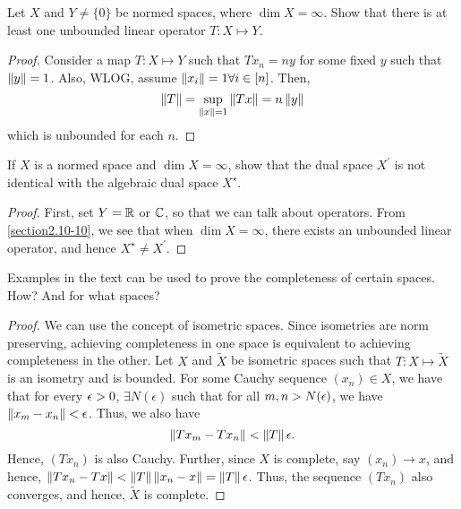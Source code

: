 \begin{question}
    Let $X$ and $Y\neq\{0\}$ be normed spaces, where $\dim X = \infty$. Show that there is at least one unbounded linear operator $T : X \mapsto Y$.
    \label{section2.10-10}
\end{question}
\begin{proof}
        Consider a map $T : X \mapsto Y$ such that $Tx_n = n y$ for some fixed $y$ such that $\left\lVert y \right\rVert = 1$. Also, WLOG, assume $\left\lVert x_i \right\rVert = 1 \forall i \in [n]$. Then, 
        \[\left\lVert T \right\rVert = \sup_{\left\lVert x \right\rVert = 1} \left\lVert Tx \right\rVert = n \left\lVert y \right\rVert\]
        which is unbounded for each $n$.
\end{proof}

\begin{question}
    If $X$ is a normed space and $\dim X = \infty$, show that the dual space $X^\prime$ is not identical with the algebraic dual space $X^\star$.
    \label{section2.10-11}
\end{question}
\begin{proof}
        First, set $Y = \mathbb{R}$ or $ \mathbb{C}$, so that we can talk about operators. From \ref{section2.10-10}, we see that when $\dim X = \infty$, there exists an unbounded linear operator, and hence $X^\star \neq X^\prime$.
\end{proof}

\begin{question}
    Examples in the text can be used to prove the completeness of certain spaces. How? And for what spaces?
    \label{section2.10-12}
\end{question}
\begin{proof}
        We can use the concept of isometric spaces. Since isometries are norm preserving, achieving completeness in one space is equivalent to achieving completeness in the other. Let $X$ and $\tilde{X}$ be isometric spaces such that $T : X \mapsto \tilde{X}$ is an isometry and is bounded. For some Cauchy sequence $(x_n) \in X$, we have that for every $\epsilon > 0$, $\exists N(\epsilon)$ such that for all $m,n > N(\epsilon)$, we have $\left\lVert x_m  -x_n \right\rVert < \epsilon$. Thus, we also have
        \[\left\lVert Tx_m - Tx_n \right\rVert < \left\lVert T \right\rVert \epsilon.\]
        Hence, $(Tx_n)$ is also Cauchy.  Further, since $X$ is complete, say $(x_n) \rightarrow x$, and hence, 
        $\left\lVert Tx_n - Tx \right\rVert < \left\lVert T \right\rVert \left\lVert x_n - x \right\rVert = \left\lVert T \right\rVert \epsilon$. Thus, the sequence $(Tx_n)$ also converges, and hence, $\tilde{X}$ is complete.
\end{proof}

